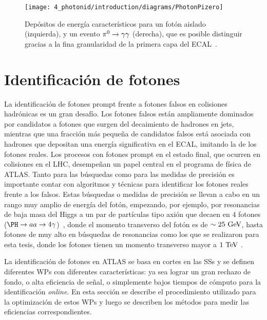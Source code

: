 \begin{figure}[ht!]
    \centering
    \texttt{[image: 4\_photonid/introduction/diagrams/PhotonPizero]}
    \caption{Dep\'ositos de energ\'ia caracter\'isticos para un fot\'on aislado (izquierda), y un evento \(\pi^{0}\rightarrow\gamma\gamma\) (derecha), que es posible distinguir gracias a la fina granularidad de la primera capa del \ac{ECAL}~\cite{ATLAS-ECAL-Pizero}.}
    \label{fig:pid_ss:ss:pizero}
\end{figure}






\section{Identificaci\'on de fotones}
\label{sec:pid_ss:pid}

La identificación de fotones prompt frente a fotones falsos en colisiones hadrónicas es un gran desaf\'io. Los fotones falsos están ampliamente dominados por candidatos a fotones que surgen del decaimiento de hadrones en jets, mientras que una fracción más pequeña de candidatos falsos está asociada con hadrones que depositan una energía significativa en el \ac{ECAL}, imitando la de los fotones reales.
Los procesos con fotones prompt en el estado final, que ocurren en colisiones \pp en el \ac{LHC}, desempeñan un papel central en el programa de física de \ac{ATLAS}. Tanto para las búsquedas como para las medidas de precisión es importante contar con algoritmos y técnicas para identificar los fotones reales frente a los falsos. Estas b\'usquedas o medidas de precisi\'on se llevan a cabo en un rango muy amplio de energ\'ia del fotón, empezando, por ejemplo, por resonancias de baja masa del Higgs a un par de partículas tipo axión que decaen en 4 fotones (\(\PH\to aa \to 4\gamma\))~\cite{ATLAS-HiggsTo4Gamma}, donde el momento transverso del fotón es de \(\sim 25~\text{GeV}\), hasta fotones de muy alto \pt en búsquedas de resonancias \gammajet como los que se realizaron para esta tesis, donde los fotones tienen un momento transverso mayor a \(1~\text{TeV}\) .

La identificaci\'on de fotones en \ac{ATLAS} se basa en cortes en las \acp{SS} y se definen diferentes \acfp{WP} con diferentes caracter\'isticas: ya sea lograr un gran rechazo de fondo, o alta eficiencia de se\~nal, o simplemente bajos tiempos de c\'omputo para la identificaci\'on \textit{online}. En esta sección se describe el procedimiento utilizado para la optimizaci\'on de estos \acp{WP} y luego se describen los m\'etodos para medir las eficiencias correspondientes.



